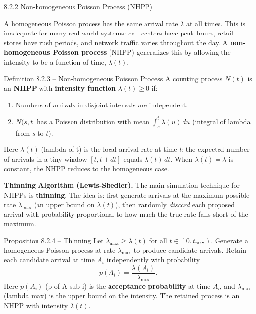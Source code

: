 \documentclass[aspectratio=169,10pt]{beamer}
\begin{document}
\begin{frame}[allowframebreaks]{8.2.2 Non-homogeneous Poisson Process (NHPP)}

A homogeneous Poisson process has the same arrival rate $\lambda$ at all times.
This is inadequate for many real-world systems: call centers have peak hours,
retail stores have rush periods, and network traffic varies throughout the day.
A \textbf{non-homogeneous Poisson process} (NHPP) generalizes this by allowing
the intensity to be a function of time, $\lambda(t)$.

\begin{block}{Definition 8.2.3 -- Non-homogeneous Poisson Process}
A counting process $N(t)$ is an \textbf{NHPP} with \textbf{intensity function}
$\lambda(t) \ge 0$ if:
\begin{enumerate}
  \item Numbers of arrivals in disjoint intervals are independent.
  \item $N(s, t]$ has a Poisson distribution with mean $\int_s^t\lambda(u)\,du$
        (integral of lambda from $s$ to $t$).
\end{enumerate}
\end{block}

Here $\lambda(t)$ (lambda of t) is the local arrival rate at time $t$: the
expected number of arrivals in a tiny window $[t, t+dt]$ equals $\lambda(t)\,dt$.
When $\lambda(t) = \lambda$ is constant, the NHPP reduces to the homogeneous case.

\framebreak

\textbf{Thinning Algorithm (Lewis-Shedler).}  The main simulation technique for
NHPPs is \textbf{thinning}.  The idea is: first generate arrivals at the maximum
possible rate $\lambda_{\max}$ (an upper bound on $\lambda(t)$), then randomly
\emph{discard} each proposed arrival with probability proportional to how much
the true rate falls short of the maximum.

\begin{block}{Proposition 8.2.4 -- Thinning}
Let $\lambda_{\max} \ge \lambda(t)$ for all $t \in (0, t_{\max})$.  Generate a
homogeneous Poisson process at rate $\lambda_{\max}$ to produce candidate
arrivals.  Retain each candidate arrival at time $A_i$ independently with
probability
\[
  p(A_i) = \frac{\lambda(A_i)}{\lambda_{\max}}.
\]
Here $p(A_i)$ (p of A sub i) is the \textbf{acceptance probability} at time $A_i$,
and $\lambda_{\max}$ (lambda max) is the upper bound on the intensity.  The
retained process is an NHPP with intensity $\lambda(t)$.
\end{block}


\end{frame}
\end{document}
